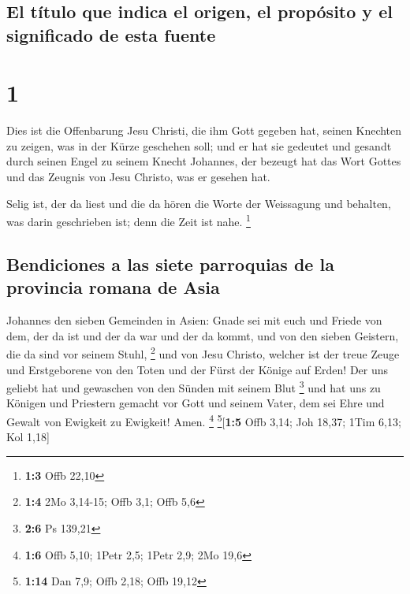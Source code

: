 \hypertarget{el-tuxedtulo-que-indica-el-origen-el-propuxf3sito-y-el-significado-de-esta-fuente}{%
\subsection{El título que indica el origen, el propósito y el
significado de esta
fuente}\label{el-tuxedtulo-que-indica-el-origen-el-propuxf3sito-y-el-significado-de-esta-fuente}}

\hypertarget{section}{%
\section{1}\label{section}}

 Dies ist die Offenbarung Jesu Christi, die ihm Gott
gegeben hat, seinen Knechten zu zeigen, was in der Kürze geschehen soll;
und er hat sie gedeutet und gesandt durch seinen Engel zu seinem Knecht
Johannes,  der bezeugt hat das Wort Gottes und das Zeugnis
von Jesu Christo, was er gesehen hat.

 Selig ist, der da liest und die da hören die Worte der
Weissagung und behalten, was darin geschrieben ist; denn die Zeit ist
nahe. \footnote{\textbf{1:3} Offb 22,10}

\hypertarget{bendiciones-a-las-siete-parroquias-de-la-provincia-romana-de-asia}{%
\subsection{Bendiciones a las siete parroquias de la provincia romana de
Asia}\label{bendiciones-a-las-siete-parroquias-de-la-provincia-romana-de-asia}}

 Johannes den sieben Gemeinden in Asien: Gnade sei mit
euch und Friede von dem, der da ist und der da war und der da kommt, und
von den sieben Geistern, die da sind vor seinem Stuhl, \footnote{\textbf{1:4}
  2Mo 3,14-15; Offb 3,1; Offb 5,6}  und von Jesu Christo,
welcher ist der treue Zeuge und Erstgeborene von den Toten und der Fürst
der Könige auf Erden! Der uns geliebt hat und gewaschen von den Sünden
mit seinem Blut \footnote{\textbf{2:6} Ps 139,21}  und hat
uns zu Königen und Priestern gemacht vor Gott und seinem Vater, dem sei
Ehre und Gewalt von Ewigkeit zu Ewigkeit! Amen. \footnote{\textbf{1:6}
  Offb 5,10; 1Petr 2,5; 1Petr 2,9; 2Mo 19,6} \footnote{\textbf{1:14} Dan
  7,9; Offb 2,18; Offb 19,12}{[}\textbf{1:5} Offb 3,14; Joh 18,37; 1Tim
6,13; Kol 1,18{]}

